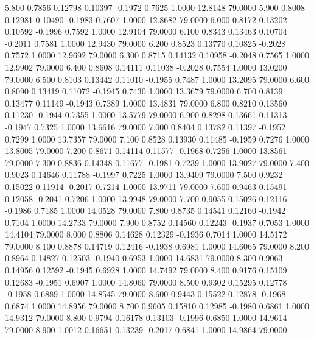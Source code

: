    5.800   0.7856   0.12798   0.10397  -0.1972   0.7625   1.0000  12.8148  79.0000
   5.900   0.8008   0.12981   0.10490  -0.1983   0.7607   1.0000  12.8682  79.0000
   6.000   0.8172   0.13202   0.10592  -0.1996   0.7592   1.0000  12.9104  79.0000
   6.100   0.8343   0.13463   0.10704  -0.2011   0.7581   1.0000  12.9430  79.0000
   6.200   0.8523   0.13770   0.10825  -0.2028   0.7572   1.0000  12.9692  79.0000
   6.300   0.8715   0.14132   0.10958  -0.2048   0.7565   1.0000  12.9902  79.0000
   6.400   0.8608   0.14111   0.11038  -0.2028   0.7554   1.0000  13.0200  79.0000
   6.500   0.8103   0.13442   0.11010  -0.1955   0.7487   1.0000  13.2095  79.0000
   6.600   0.8090   0.13419   0.11072  -0.1945   0.7430   1.0000  13.3679  79.0000
   6.700   0.8139   0.13477   0.11149  -0.1943   0.7389   1.0000  13.4831  79.0000
   6.800   0.8210   0.13560   0.11230  -0.1944   0.7355   1.0000  13.5779  79.0000
   6.900   0.8298   0.13661   0.11313  -0.1947   0.7325   1.0000  13.6616  79.0000
   7.000   0.8404   0.13782   0.11397  -0.1952   0.7299   1.0000  13.7357  79.0000
   7.100   0.8528   0.13930   0.11485  -0.1959   0.7276   1.0000  13.8005  79.0000
   7.200   0.8671   0.14114   0.11577  -0.1968   0.7256   1.0000  13.8561  79.0000
   7.300   0.8836   0.14348   0.11677  -0.1981   0.7239   1.0000  13.9027  79.0000
   7.400   0.9023   0.14646   0.11788  -0.1997   0.7225   1.0000  13.9409  79.0000
   7.500   0.9232   0.15022   0.11914  -0.2017   0.7214   1.0000  13.9711  79.0000
   7.600   0.9463   0.15491   0.12058  -0.2041   0.7206   1.0000  13.9948  79.0000
   7.700   0.9055   0.15026   0.12116  -0.1986   0.7185   1.0000  14.0528  79.0000
   7.800   0.8735   0.14541   0.12160  -0.1942   0.7104   1.0000  14.2733  79.0000
   7.900   0.8752   0.14560   0.12243  -0.1937   0.7053   1.0000  14.4104  79.0000
   8.000   0.8806   0.14628   0.12329  -0.1936   0.7014   1.0000  14.5172  79.0000
   8.100   0.8878   0.14719   0.12416  -0.1938   0.6981   1.0000  14.6065  79.0000
   8.200   0.8964   0.14827   0.12503  -0.1940   0.6953   1.0000  14.6831  79.0000
   8.300   0.9063   0.14956   0.12592  -0.1945   0.6928   1.0000  14.7492  79.0000
   8.400   0.9176   0.15109   0.12683  -0.1951   0.6907   1.0000  14.8060  79.0000
   8.500   0.9302   0.15295   0.12778  -0.1958   0.6889   1.0000  14.8545  79.0000
   8.600   0.9443   0.15522   0.12878  -0.1968   0.6874   1.0000  14.8956  79.0000
   8.700   0.9605   0.15810   0.12985  -0.1980   0.6861   1.0000  14.9312  79.0000
   8.800   0.9794   0.16178   0.13103  -0.1996   0.6850   1.0000  14.9614  79.0000
   8.900   1.0012   0.16651   0.13239  -0.2017   0.6841   1.0000  14.9864  79.0000
